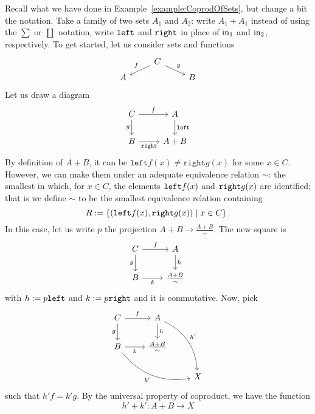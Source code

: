 \begin{example}\label{example:PushoutsInSet}
Recall what we have done in Example~\ref{example:CoprodOfSets}, but change a bit the notation. Take a family of two sets \(A_1\) and \(A_2\): write \(A_1+A_1\) instead of using the \(\sum\) or \(\coprod\) notation, write \(\mathtt{left}\) and \(\mathtt{right}\) in place of \(\operatorname{in}_1\) and \(\operatorname{in}_2\), respectively.\newline
To get started, let us consider sets and functions
\[\begin{tikzcd}[row sep=tiny]
  & C \ar["f", dl, swap] \ar["g", dr] &   \\
A &                                   & B 
\end{tikzcd}\]
Let us draw a diagram
\begin{equation}\begin{tikzcd}
C \ar["f", r] \ar["g", d, swap]  & A \ar["\linj", d] \\
B \ar["\rinj", r, swap] & A+B
\end{tikzcd}\label{diagram:NotYetACommSquareInSet}\end{equation}
By definition of \(A+B\), it can be \(\mathtt{left} f(x) \ne \mathtt{right} g(x)\) for some \(x \in C\). However, we can make them  under an adequate equivalence relation \(\sim\): the smallest in which, for \(x \in C\), the elements \(\mathtt{left} f(x)\) and \(\mathtt{right} g(x)\) are identified; that is we define \(\sim\) to be the smallest equivalence relation containing
\[R := \left\{(\mathtt{left} f(x), \mathtt{right} g(x)) \mid x \in C\right\}.\]
In this case, let us write \(p\) the projection \(A+B \to \frac{A+B}{\sim}\). The new square is
\begin{equation}\begin{tikzcd}
C \ar["f", r] \ar["g", d, swap] & A \ar["h", d]    \\
B \ar["k", r, swap]             & \frac{A+B}{\sim}
\end{tikzcd}\label{diagram:NowACommSquareInSet}\end{equation}
with \(h := p \mathtt{left}\) and \(k := p \mathtt{right}\) and it is commutative. Now, pick
\[\begin{tikzcd}
C \ar["f", r] \ar["g", d, swap] & A \ar["h", d] \ar["{h'}", ddr, bend left] \\
B \ar["k", r, swap] \ar["{k'}", drr, bend right, swap] & \frac{A+B}{\sim} \\
 & & X
\end{tikzcd}\]
such that \(h'f = k'g\). By the universal property of coproduct, we have the function
\[h' + k' : A + B \to X\]

\end{example}
